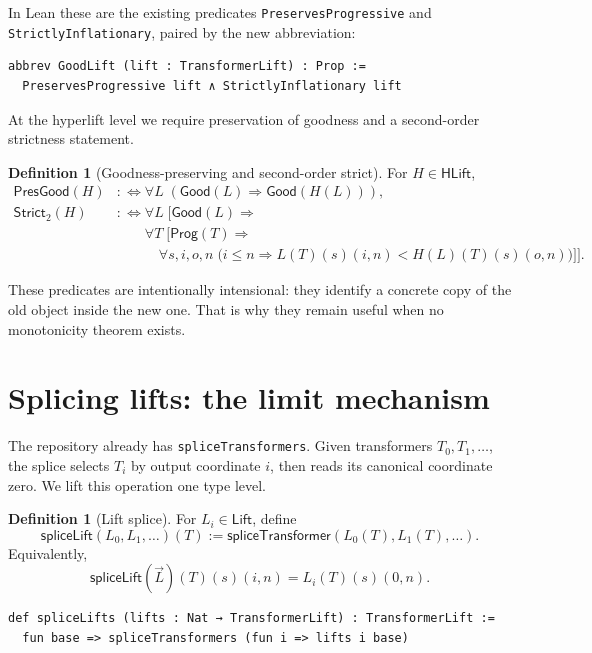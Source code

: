 \documentclass[11pt]{article}
\theoremstyle{definition}
\newtheorem{definition}[theorem]{Definition}
\theoremstyle{remark}
\newcommand{\code}[1]{\texttt{#1}}
\newcommand{\Lift}{\mathsf{Lift}}
\newcommand{\HLift}{\mathsf{HLift}}
\newcommand{\Prog}{\mathsf{Prog}}
\newcommand{\Good}{\mathsf{Good}}
\begin{document}
In Lean these are the existing predicates \code{PreservesProgressive} and
\code{StrictlyInflationary}, paired by the new abbreviation:

\begin{lstlisting}
abbrev GoodLift (lift : TransformerLift) : Prop :=
  PreservesProgressive lift ∧ StrictlyInflationary lift
\end{lstlisting}

At the hyperlift level we require preservation of goodness and a second-order
strictness statement.

\begin{definition}[Goodness-preserving and second-order strict]
For \(H\in\HLift\),
\begin{align*}
\mathsf{PresGood}(H)&:\Longleftrightarrow
  \forall L\;(\Good(L)\Rightarrow\Good(H(L))),\\
\mathsf{Strict}_2(H)&:\Longleftrightarrow
  \forall L\;\bigl[\Good(L)\Rightarrow{}\\
 &\qquad \forall T\;\bigl[\Prog(T)\Rightarrow{}\\
 &\qquad\quad \forall s,i,o,n\;\bigl(i\le n\Rightarrow
    L(T)(s)(i,n)<H(L)(T)(s)(o,n)\bigr)\bigr]\bigr].
\end{align*}
\end{definition}

These predicates are intentionally intensional: they identify a concrete copy
of the old object inside the new one.  That is why they remain useful when no
monotonicity theorem exists.

\section{Splicing lifts: the limit mechanism}

The repository already has \code{spliceTransformers}.  Given transformers
\(T_0,T_1,\ldots\), the splice selects \(T_i\) by output coordinate \(i\), then
reads its canonical coordinate zero.  We lift this operation one type level.

\begin{definition}[Lift splice]
For \(L_i\in\Lift\), define
\[
\mathsf{spliceLift}(L_0,L_1,\ldots)(T)
:=\mathsf{spliceTransformer}(L_0(T),L_1(T),\ldots).
\]
Equivalently,
\[
\mathsf{spliceLift}(\vec L)(T)(s)(i,n)=L_i(T)(s)(0,n).
\]
\end{definition}

\begin{lstlisting}
def spliceLifts (lifts : Nat → TransformerLift) : TransformerLift :=
  fun base => spliceTransformers (fun i => lifts i base)
\end{lstlisting}
\end{document}
